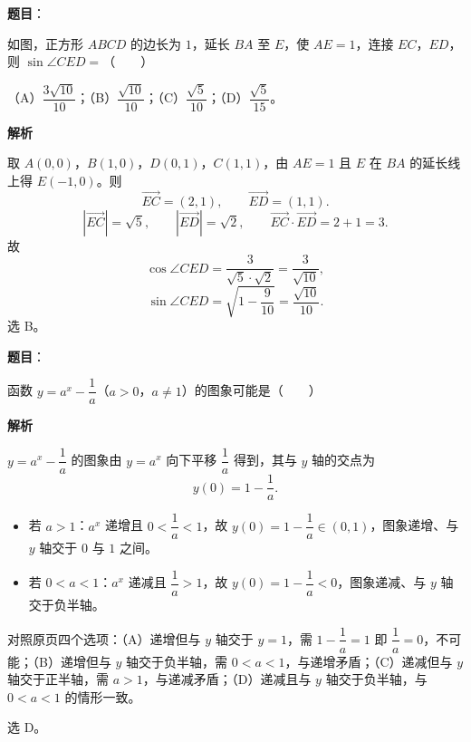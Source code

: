 \begin{answer}

\textbf{题目}：

如图，正方形 $ABCD$ 的边长为 $1$，延长 $BA$ 至 $E$，使 $AE=1$，连接 $EC$，$ED$，则 $\sin\angle CED=$\mbox{（　　）}
\nopagebreak[4]
\begin{center}\end{center}
\nopagebreak[4]
（A）$\dfrac{3\sqrt{10}}{10}$；（B）$\dfrac{\sqrt{10}}{10}$；（C）$\dfrac{\sqrt5}{10}$；（D）$\dfrac{\sqrt5}{15}$。

\textbf{解析}

取 $A(0,0)$，$B(1,0)$，$D(0,1)$，$C(1,1)$，由 $AE=1$ 且 $E$ 在 $BA$ 的延长线上得 $E(-1,0)$。则
\nopagebreak[4]
\[\overrightarrow{EC}=(2,1),\qquad \overrightarrow{ED}=(1,1).\]
\nopagebreak[4]
\[|\overrightarrow{EC}|=\sqrt5,\qquad |\overrightarrow{ED}|=\sqrt2,\qquad \overrightarrow{EC}\cdot\overrightarrow{ED}=2+1=3.\]
故
\nopagebreak[4]
\[\cos\angle CED=\frac{3}{\sqrt5\cdot\sqrt2}=\frac{3}{\sqrt{10}},\]
\nopagebreak[4]
\[\sin\angle CED=\sqrt{1-\frac9{10}}=\frac{\sqrt{10}}{10}.\]
选 B。


\end{answer}
\begin{answer}

\textbf{题目}：

函数 $y=a^x-\dfrac1a$（$a>0$，$a\neq1$）的图象可能是\mbox{（　　）}
\nopagebreak[4]
\begin{center}\end{center}
\nopagebreak[4]
\textbf{解析}

$y=a^x-\dfrac1a$ 的图象由 $y=a^x$ 向下平移 $\dfrac1a$ 得到，其与 $y$ 轴的交点为
\nopagebreak[4]
\[y(0)=1-\frac1a.\]

\begin{itemize}
\item 若 $a>1$：$a^x$ 递增且 $0<\dfrac1a<1$，故 $y(0)=1-\dfrac1a\in(0,1)$，图象递增、与 $y$ 轴交于 $0$ 与 $1$ 之间。
\item 若 $0<a<1$：$a^x$ 递减且 $\dfrac1a>1$，故 $y(0)=1-\dfrac1a<0$，图象递减、与 $y$ 轴交于负半轴。
\end{itemize}

对照原页四个选项：（A）递增但与 $y$ 轴交于 $y=1$，需 $1-\dfrac1a=1$ 即 $\dfrac1a=0$，不可能；（B）递增但与 $y$ 轴交于负半轴，需 $0<a<1$，与递增矛盾；（C）递减但与 $y$ 轴交于正半轴，需 $a>1$，与递减矛盾；（D）递减且与 $y$ 轴交于负半轴，与 $0<a<1$ 的情形一致。

选 D。


\end{answer}
